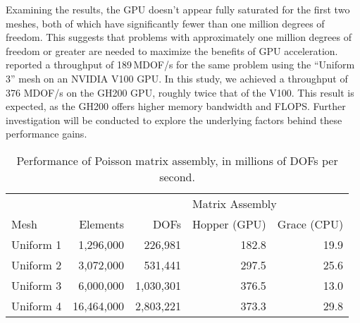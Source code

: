 Examining the results, the GPU doesn't appear fully saturated for the first two meshes, both of which have significantly fewer than one million degrees of freedom. This suggests that problems with approximately one million degrees of freedom or greater are needed to maximize the benefits of GPU acceleration. \cite{trotter2023targeting} reported a throughput of 189\,MDOF/s for the same problem using the ``Uniform 3'' mesh on an NVIDIA V100 GPU. In this study, we achieved a throughput of 376 MDOF/s on the GH200 GPU, roughly twice that of the V100. This result is expected, as the GH200 offers higher memory bandwidth and FLOPS. Further investigation will be conducted to explore the underlying factors behind these performance gains.

\begin{table}[t]
    \centering
\begin{tabular}{lrrrr}
\toprule
          &          &             & \multicolumn{2}{l}{Matrix Assembly} \\
                                     \cmidrule(lr){4-5}
Mesh      & Elements & DOFs        & Hopper (GPU) & Grace (CPU) \\
\midrule
Uniform 1 &  1,296,000 &   226,981 & 182.8 & 19.9 \\
Uniform 2 &  3,072,000 &   531,441 & 297.5 & 25.6 \\
Uniform 3 &  6,000,000 & 1,030,301 & 376.5 & 13.0 \\
Uniform 4 & 16,464,000 & 2,803,221 & 373.3 & 29.8 \\
\bottomrule
\end{tabular}
\caption{Performance of Poisson matrix assembly, in millions of DOFs per second.}
    \label{tab:poisson_results}
\end{table}

